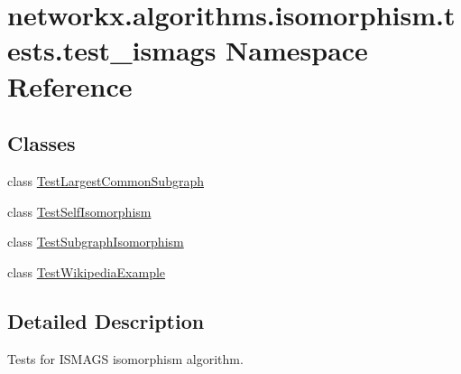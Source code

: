 \hypertarget{namespacenetworkx_1_1algorithms_1_1isomorphism_1_1tests_1_1test__ismags}{}\section{networkx.\+algorithms.\+isomorphism.\+tests.\+test\+\_\+ismags Namespace Reference}
\label{namespacenetworkx_1_1algorithms_1_1isomorphism_1_1tests_1_1test__ismags}
\subsection*{Classes}
\begin{DoxyCompactItemize}
\item 
class \hyperlink{classnetworkx_1_1algorithms_1_1isomorphism_1_1tests_1_1test__ismags_1_1TestLargestCommonSubgraph}{Test\+Largest\+Common\+Subgraph}
\item 
class \hyperlink{classnetworkx_1_1algorithms_1_1isomorphism_1_1tests_1_1test__ismags_1_1TestSelfIsomorphism}{Test\+Self\+Isomorphism}
\item 
class \hyperlink{classnetworkx_1_1algorithms_1_1isomorphism_1_1tests_1_1test__ismags_1_1TestSubgraphIsomorphism}{Test\+Subgraph\+Isomorphism}
\item 
class \hyperlink{classnetworkx_1_1algorithms_1_1isomorphism_1_1tests_1_1test__ismags_1_1TestWikipediaExample}{Test\+Wikipedia\+Example}
\end{DoxyCompactItemize}


\subsection{Detailed Description}
\begin{DoxyVerb}    Tests for ISMAGS isomorphism algorithm.
\end{DoxyVerb}
 
